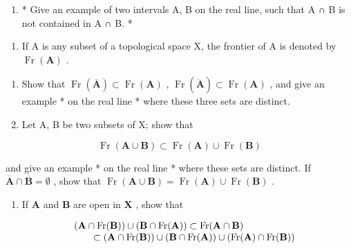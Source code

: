 \begin{enumerate}
\def\labelenumi{\alph{enumi})}
\setcounter{enumi}{1}
\tightlist
\item
  * Give an example of two intervals A, B on the real line, such that A ∩ B is not contained in A ∩ B. *
\end{enumerate}

\begin{enumerate}
\def\labelenumi{\arabic{enumi})}
\setcounter{enumi}{4}
\tightlist
\item
  If A is any subset of a topological space X, the frontier of A is denoted by \(\operatorname{Fr}(\mathbf{A})\) .
\end{enumerate}

\begin{enumerate}
\def\labelenumi{\alph{enumi})}
\item
  Show that \(\operatorname{Fr}(\overline{\mathbf{A}}) \subset \operatorname{Fr}(\mathbf{A})\) , \(\operatorname{Fr}(\mathring{\mathbf{A}}) \subset \operatorname{Fr}(\mathbf{A})\) , and give an example * on the real line * where these three sets are distinct.
\item
  Let A, B be two subsets of X; show that
\end{enumerate}

\[
\operatorname{Fr} (\mathbf {A} \cup \mathbf {B}) \subset \operatorname{Fr} (\mathbf {A}) \cup \operatorname{Fr} (\mathbf {B})
\]

and give an example * on the real line * where these sets are distinct. If \(\overline{\mathbf{A}} \cap \overline{\mathbf{B}} = \emptyset\) , show that \(\operatorname{Fr}(\mathbf{A} \cup \mathbf{B}) = \operatorname{Fr}(\mathbf{A}) \cup \operatorname{Fr}(\mathbf{B})\) .

\begin{enumerate}
\def\labelenumi{\alph{enumi})}
\setcounter{enumi}{2}
\tightlist
\item
  If \(\mathbf{A}\) and \(\mathbf{B}\) are open in \(\mathbf{X}\) , show that
\end{enumerate}

\[
\begin{array}{r l} & (\mathbf {A} \cap \operatorname{Fr} (\mathbf {B})) \cup (\mathbf {B} \cap \operatorname{Fr} (\mathbf {A})) \subset \operatorname{Fr} (\mathbf {A} \cap \mathbf {B}) \\ & \qquad \subset (\mathbf {A} \cap \operatorname{Fr} (\mathbf {B})) \cup (\mathbf {B} \cap \operatorname{Fr} (\mathbf {A})) \cup (\operatorname{Fr} (\mathbf {A}) \cap \operatorname{Fr} (\mathbf {B})) \end{array}
\]

